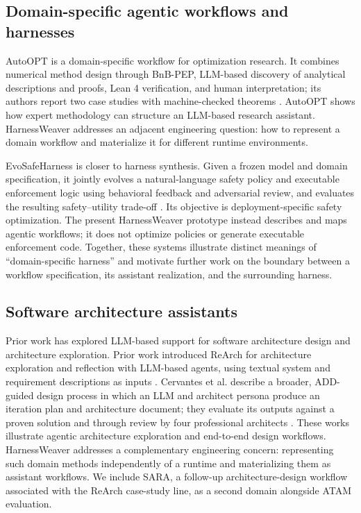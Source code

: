 \documentclass[10pt,conference]{IEEEtran}
\begin{document}
\subsection{Domain-specific agentic workflows and harnesses}

AutoOPT is a domain-specific workflow for optimization research. It combines numerical method design through BnB-PEP, LLM-based discovery of analytical descriptions and proofs, Lean 4 verification, and human interpretation; its authors report two case studies with machine-checked theorems \cite{autoopt}. AutoOPT shows how expert methodology can structure an LLM-based research assistant. HarnessWeaver addresses an adjacent engineering question: how to represent a domain workflow and materialize it for different runtime environments.

EvoSafeHarness is closer to harness synthesis. Given a frozen model and domain specification, it jointly evolves a natural-language safety policy and executable enforcement logic using behavioral feedback and adversarial review, and evaluates the resulting safety--utility trade-off \cite{evosafe}. Its objective is deployment-specific safety optimization. The present HarnessWeaver prototype instead describes and maps agentic workflows; it does not optimize policies or generate executable enforcement code. Together, these systems illustrate distinct meanings of ``domain-specific harness'' and motivate further work on the boundary between a workflow specification, its assistant realization, and the surrounding harness.

\subsection{Software architecture assistants}

Prior work has explored LLM-based support for software architecture design and architecture exploration. Prior work introduced ReArch for architecture exploration and reflection with LLM-based agents, using textual system and requirement descriptions as inputs \cite{rearch}. Cervantes et al. describe a broader, ADD-guided design process in which an LLM and architect persona produce an iteration plan and architecture document; they evaluate its outputs against a proven solution and through review by four professional architects \cite{bettertogether}. These works illustrate agentic architecture exploration and end-to-end design workflows. HarnessWeaver addresses a complementary engineering concern: representing such domain methods independently of a runtime and materializing them as assistant workflows. We include SARA, a follow-up architecture-design workflow associated with the ReArch case-study line, as a second domain alongside ATAM evaluation.
\end{document}
